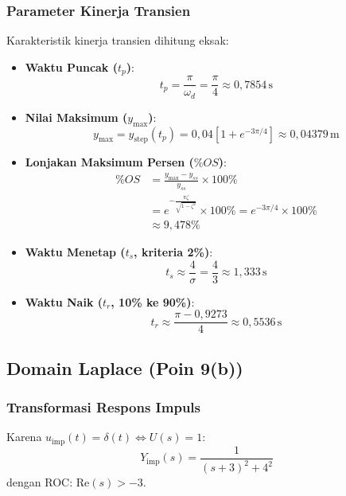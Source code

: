 \documentclass[journal]{IEEEtran}
\begin{document}
\subsubsection{Parameter Kinerja Transien}
Karakteristik kinerja transien dihitung eksak:
\begin{itemize}
    \item \textbf{Waktu Puncak ($t_p$)}:
    \begin{equation}
        t_p = \frac{\pi}{\omega_d} = \frac{\pi}{4} \approx 0{,}7854\,\text{s}
    \end{equation}
    \item \textbf{Nilai Maksimum ($y_{\max}$)}:
    \begin{equation}
        y_{\max} = y_{\text{step}}(t_p) = 0{,}04 \left[ 1 + e^{-3\pi / 4} \right] \approx 0{,}04379\,\text{m}
    \end{equation}
    \item \textbf{Lonjakan Maksimum Persen ($\%OS$)}:
    \begin{align}
        \%OS &= \frac{y_{\max} - y_{ss}}{y_{ss}} \times 100\% \nonumber \\
        &= e^{-\frac{\pi \zeta}{\sqrt{1 - \zeta^2}}} \times 100\% = e^{-3\pi / 4} \times 100\% \nonumber \\
        &\approx 9{,}478\%
    \end{align}
    \item \textbf{Waktu Menetap ($t_s$, kriteria 2\%)}:
    \begin{equation}
        t_s \approx \frac{4}{\sigma} = \frac{4}{3} \approx 1{,}333\,\text{s}
    \end{equation}
    \item \textbf{Waktu Naik ($t_r$, 10\% ke 90\%)}:
    \begin{equation}
        t_r \approx \frac{\pi - 0{,}9273}{4} \approx 0{,}5536\,\text{s}
    \end{equation}
\end{itemize}

\subsection{Domain Laplace (Poin 9(b))}
\subsubsection{Transformasi Respons Impuls}
Karena $u_{\text{imp}}(t) = \delta(t) \iff U(s) = 1$:
\begin{equation}
    Y_{\text{imp}}(s) = \frac{1}{(s + 3)^2 + 4^2}
    \label{eq:Y_imp_s}
\end{equation}
dengan ROC: $\text{Re}(s) > -3$.
\end{document}
